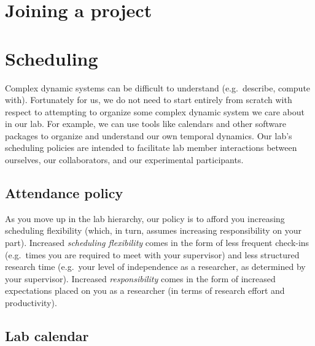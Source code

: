\documentclass{tufte-book} %
\begin{document}
\newpage
\section{Joining a project}




%  


\newpage
\section{Scheduling}
Complex dynamic systems can be difficult to understand (e.g.\
describe, compute with).  Fortunately for us, we do not need to start
entirely from scratch with respect to attempting to organize some
complex dynamic system we care about in our lab.  For example, we can
use tools like calendars and other software packages to organize and
understand our own temporal dynamics.  Our lab's scheduling policies
are intended to facilitate lab member interactions between ourselves,
our collaborators, and our experimental participants.

 \subsection{Attendance policy}
 As you move up in the lab hierarchy, our policy is to afford
 you increasing scheduling flexibility (which, in turn, assumes
 increasing responsibility on your part).  Increased
 \textit{scheduling flexibility} comes in the form of less frequent
 check-ins (e.g.\ times you are required to meet with your supervisor)
 and less structured research time (e.g.\ your level of independence
 as a researcher, as determined by your supervisor).  Increased
 \textit{responsibility} comes in the form of increased expectations
 placed on you as a researcher (in terms of research effort and
 productivity).





 \subsection{Lab calendar}
\end{document}
